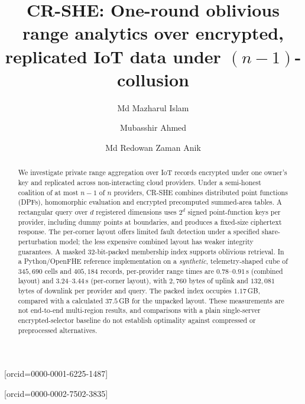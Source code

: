 \documentclass[a4paper,fleqn]{cas-sc}
\newif\ifanonymous
\begin{document}
\let\WriteBookmarks\relax
\def\floatpagepagefraction{1}
\def\textpagefraction{.001}

\ifanonymous\shortauthors{Anonymous authors}\else{}\fi

\title[mode=title]{CR-SHE: One-round oblivious range analytics over
encrypted, replicated IoT data under $(n{-}1)$-collusion}

\ifanonymous\else
\author[1]{Md Mazharul Islam}[orcid=0000-0001-6225-1487]
\cormark[1]

\author[1]{Mubasshir Ahmed}[orcid=0000-0002-7502-3835]

\author[1]{Md Redowan Zaman Anik}


\fi

\begin{abstract}
We investigate private range aggregation over IoT records encrypted under
one owner's key and replicated across non-interacting cloud providers.
Under a semi-honest coalition of at most $n-1$ of $n$ providers,
CR-SHE combines distributed point functions (DPFs), homomorphic evaluation
and encrypted precomputed summed-area tables. A rectangular query over
$d$ registered dimensions uses $2^d$ signed point-function keys per
provider, including dummy points at boundaries, and produces a
fixed-size ciphertext response. The per-corner layout offers limited
fault detection under a specified share-perturbation model; the less
expensive combined layout has weaker integrity guarantees.
A masked 32-bit-packed membership index supports oblivious retrieval.
In a Python/OpenFHE reference implementation on a \emph{synthetic},
telemetry-shaped cube of $345{,}690$ cells and $405{,}184$ records,
per-provider range times are $0.78$--$0.91$\,s (combined layout) and
$3.24$--$3.44$\,s (per-corner layout), with $2{,}760$ bytes of
uplink and $132{,}081$ bytes of downlink per provider and query.
The packed index occupies $1.17$\,GB, compared with a calculated
$37.5$\,GB for the unpacked layout. These measurements are not
end-to-end multi-region results, and comparisons with a plain
single-server encrypted-selector baseline do not establish
optimality against compressed or preprocessed alternatives.
\end{abstract}
\end{document}
